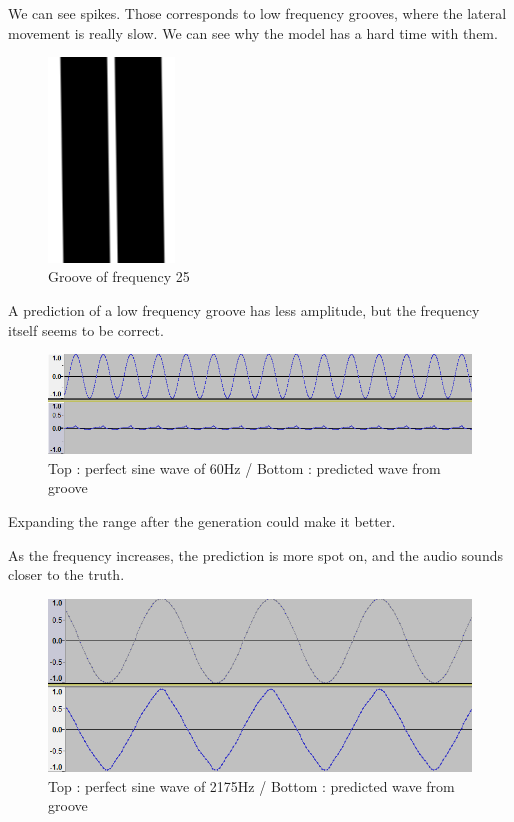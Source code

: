 \documentclass[12pt, twoside]{article}
\begin{document}
We can see spikes. Those corresponds to low frequency grooves, where the lateral movement is really slow. We can see why the model has a hard time with them.

\begin{figure}
	\centering
	\includegraphics[width=0.3\textwidth]{../images/low_freq.png}
	\caption{Groove of frequency 25}
	\label{lowfreq}
\end{figure}

A prediction of a low frequency groove has less amplitude, but the frequency itself seems to be correct.

\begin{figure}
	\centering
	\includegraphics[width=1.0\textwidth]{../images/pred_60.png}
	\caption{Top : perfect sine wave of 60Hz / Bottom : predicted wave from groove}
	\label{pred60}
\end{figure}

Expanding the range after the generation could make it better.

As the frequency increases, the prediction is more spot on, and the audio sounds closer to the truth. 

\begin{figure}
	\centering
	\includegraphics[width=1.0\textwidth]{../images/pred_2175.png}
	\caption{Top : perfect sine wave of 2175Hz / Bottom : predicted wave from groove}
	\label{pred2175}
\end{figure}
\end{document}
